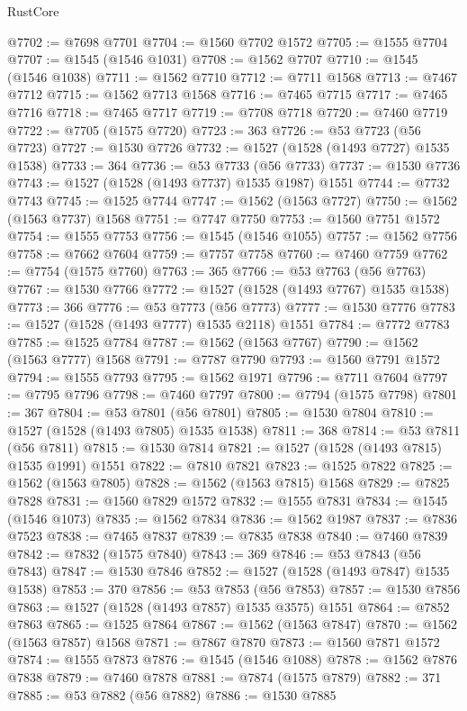 \begin{lexlean}{RustCore}
\begin{coremodule}
@7702 := @7698 @7701
@7704 := @1560 @7702 @1572
@7705 := @1555 @7704
@7707 := @1545 (@1546 @1031)
@7708 := @1562 @7707
@7710 := @1545 (@1546 @1038)
@7711 := @1562 @7710
@7712 := @7711 @1568
@7713 := @7467 @7712
@7715 := @1562 @7713 @1568
@7716 := @7465 @7715
@7717 := @7465 @7716
@7718 := @7465 @7717
@7719 := @7708 @7718
@7720 := @7460 @7719
@7722 := @7705 (@1575 @7720)
@7723 := 363
@7726 := @53 @7723 (@56 @7723)
@7727 := @1530 @7726
@7732 := @1527 (@1528 (@1493 @7727) @1535 @1538)
@7733 := 364
@7736 := @53 @7733 (@56 @7733)
@7737 := @1530 @7736
@7743 := @1527 (@1528 (@1493 @7737) @1535 @1987) @1551
@7744 := @7732 @7743
@7745 := @1525 @7744
@7747 := @1562 (@1563 @7727)
@7750 := @1562 (@1563 @7737) @1568
@7751 := @7747 @7750
@7753 := @1560 @7751 @1572
@7754 := @1555 @7753
@7756 := @1545 (@1546 @1055)
@7757 := @1562 @7756
@7758 := @7662 @7604
@7759 := @7757 @7758
@7760 := @7460 @7759
@7762 := @7754 (@1575 @7760)
@7763 := 365
@7766 := @53 @7763 (@56 @7763)
@7767 := @1530 @7766
@7772 := @1527 (@1528 (@1493 @7767) @1535 @1538)
@7773 := 366
@7776 := @53 @7773 (@56 @7773)
@7777 := @1530 @7776
@7783 := @1527 (@1528 (@1493 @7777) @1535 @2118) @1551
@7784 := @7772 @7783
@7785 := @1525 @7784
@7787 := @1562 (@1563 @7767)
@7790 := @1562 (@1563 @7777) @1568
@7791 := @7787 @7790
@7793 := @1560 @7791 @1572
@7794 := @1555 @7793
@7795 := @1562 @1971
@7796 := @7711 @7604
@7797 := @7795 @7796
@7798 := @7460 @7797
@7800 := @7794 (@1575 @7798)
@7801 := 367
@7804 := @53 @7801 (@56 @7801)
@7805 := @1530 @7804
@7810 := @1527 (@1528 (@1493 @7805) @1535 @1538)
@7811 := 368
@7814 := @53 @7811 (@56 @7811)
@7815 := @1530 @7814
@7821 := @1527 (@1528 (@1493 @7815) @1535 @1991) @1551
@7822 := @7810 @7821
@7823 := @1525 @7822
@7825 := @1562 (@1563 @7805)
@7828 := @1562 (@1563 @7815) @1568
@7829 := @7825 @7828
@7831 := @1560 @7829 @1572
@7832 := @1555 @7831
@7834 := @1545 (@1546 @1073)
@7835 := @1562 @7834
@7836 := @1562 @1987
@7837 := @7836 @7523
@7838 := @7465 @7837
@7839 := @7835 @7838
@7840 := @7460 @7839
@7842 := @7832 (@1575 @7840)
@7843 := 369
@7846 := @53 @7843 (@56 @7843)
@7847 := @1530 @7846
@7852 := @1527 (@1528 (@1493 @7847) @1535 @1538)
@7853 := 370
@7856 := @53 @7853 (@56 @7853)
@7857 := @1530 @7856
@7863 := @1527 (@1528 (@1493 @7857) @1535 @3575) @1551
@7864 := @7852 @7863
@7865 := @1525 @7864
@7867 := @1562 (@1563 @7847)
@7870 := @1562 (@1563 @7857) @1568
@7871 := @7867 @7870
@7873 := @1560 @7871 @1572
@7874 := @1555 @7873
@7876 := @1545 (@1546 @1088)
@7878 := @1562 @7876 @7838
@7879 := @7460 @7878
@7881 := @7874 (@1575 @7879)
@7882 := 371
@7885 := @53 @7882 (@56 @7882)
@7886 := @1530 @7885

\end{coremodule}
\end{lexlean}
